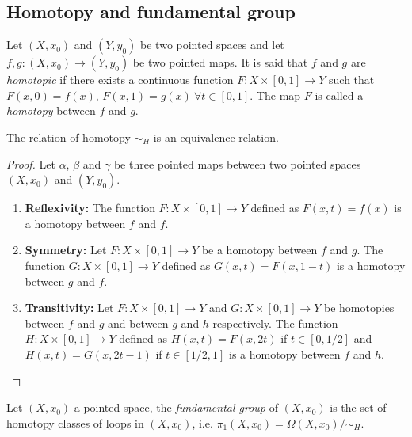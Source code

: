 \documentclass[12pt]{article}
\begin{document}
\subsection{Homotopy and fundamental group}

\begin{definition}
	Let \((X, x_0)\) and \((Y, y_0)\) be two pointed spaces and let \(f, g: (X, x_0) \rightarrow (Y, y_0)\) be two pointed maps. It is said that \(f\) and \(g\) are \textit{homotopic} if there exists a continuous function \(F: X \times [0,1] \rightarrow Y\) such that \(F(x, 0) = f(x)\), \(F(x, 1) = g(x) \ \forall t \in [0,1]\). The map \(F\) is called a \textit{homotopy} between \(f\) and \(g\).
\end{definition}

\begin{theorem}
	The relation of homotopy \(\sim_H\) is an equivalence relation.
\end{theorem}

\begin{proof}
	Let \(\alpha\), \(\beta\) and \(\gamma\) be three pointed maps between two pointed spaces \((X, x_0)\) and \((Y, y_0)\).
	\begin{enumerate}
		\item \textbf{Reflexivity:} The function \(F: X \times [0,1] \rightarrow Y\) defined as \(F(x, t) = f(x)\) is a homotopy between \(f\) and \(f\).
		\item \textbf{Symmetry:} Let \(F: X \times [0,1] \rightarrow Y\) be a homotopy between \(f\) and \(g\). The function \(G: X \times[0,1] \rightarrow Y\) defined as \(G(x, t) = F(x, 1-t)\) is a homotopy between \(g\) and \(f\).
		\item \textbf{Transitivity:} Let \(F: X \times [0,1] \rightarrow Y\) and \(G: X \times [0,1] \rightarrow Y\) be homotopies between \(f\) and \(g\) and between \(g\) and \(h\) respectively. The function \(H: X \times [0,1] \rightarrow Y\) defined as \(H(x, t)= F(x, 2t)\) if \(t \in [0, 1/2]\) and \(H(x, t) = G(x, 2t-1)\) if \(t \in [1/2, 1]\) is a homotopy between \(f\) and \(h\).
	\end{enumerate}
\end{proof}

\begin{definition}
	Let \((X, x_0)\) a pointed space, the \textit{fundamental group} of \((X, x_0)\) is the set of homotopy classes of loops in \((X, x_0)\), i.e. \(\pi_1(X, x_0) = \Omega(X, x_0) / \sim_H\).
\end{definition}
\end{document}
